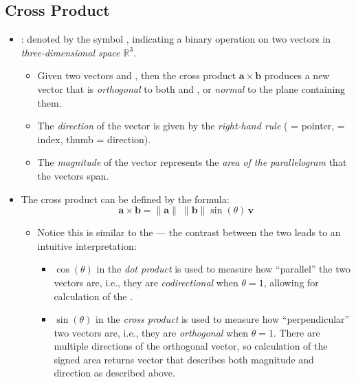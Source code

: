 \begin{itemize}
  \subsection{Cross Product}\label{Cross Product}
  \begin{itemize}
    \item {}: denoted by the symbol \jjj{\(\bm{\times} \)}, indicating a binary operation on two vectors in \emph{three-dimensional space \(\mathbb{R}^3 \)}.
      \begin{itemize}
        \item Given two \hyperref[Linear Independence]{} vectors  and , then the cross product \(\bm{a}\times\bm{b}\) produces a new vector that is \emph{orthogonal} to both  and , or \emph{normal} to the plane containing them.
        \item The \emph{direction} of the vector is given by the \emph{right-hand rule} ( = pointer,  = index, thumb = direction). 
        \item The \emph{magnitude} of the vector represents the \emph{area of the parallelogram} that the vectors span.
      \end{itemize}
    \item The cross product can be defined by the formula: 
    \[%
    \bm{a}\times \bm{b} = \| \bm{a} \|~\| \bm{b} \|\sin(\theta)\,\bm{v}
    \]%
    \begin{itemize}
      \item Notice this is similar to the \hyperref[Geometric Interpretation of the Dot Product]{} --- the contrast between the two leads to an intuitive interpretation:
      \begin{itemize}
        \item \(\cos(\theta)\) in the \emph{dot product} is used to measure how ``parallel'' the two vectors are, i.e., they are \emph{codirectional} when \(\theta = 1\), allowing for calculation of the \hyperref[Vector Length]{}. 
        \item \(\sin(\theta)\) in the \emph{cross product} is used to measure how ``perpendicular'' two vectors are, i.e., they are \emph{orthogonal} when \(\theta = 1\). There are multiple directions of the orthogonal vector, so calculation of the signed area returns vector  that describes both magnitude and direction as described above.

\end{itemize}
\end{itemize}
\end{itemize}
\end{itemize}
